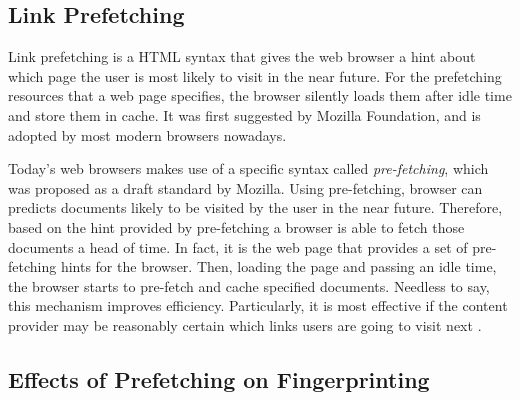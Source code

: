 
\subsection{Link Prefetching}

Link prefetching is a HTML syntax that gives the web browser a hint about which page the user is most likely to visit in the near future.
For the prefetching resources that a web page specifies, the browser silently loads them after idle time and store them in cache. 
It was first suggested by Mozilla Foundation, and is adopted by most modern browsers nowadays.

Today's web browsers makes use of a specific syntax called \emph{pre-fetching}, which was proposed as a draft standard by Mozilla.
Using pre-fetching, browser can predicts documents likely to be visited by the user in the near future.
Therefore, based on the hint provided by pre-fetching a browser is able to fetch those documents a head of time.
In fact, it is the web page that provides a set of pre-fetching hints for the browser.
Then, loading the page and passing an idle time, the browser starts to pre-fetch and cache specified documents.
Needless to say, this mechanism improves efficiency.
Particularly, it is most effective if the content provider may be reasonably certain which links users are going to visit next \cite{wikiPreF}.

\subsection{Effects of Prefetching on Fingerprinting}

